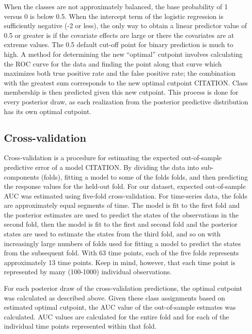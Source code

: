 \documentclass[12pt,letterpaper]{article}
\begin{document}
When the classes are not approximately balanced, the base probability of 1 versus 0 is below 0.5. When the intercept term of the logistic regression is sufficiently negative (-2 or less), the only way to obtain a linear predictor value of 0.5 or greater is if the covariate effects are large or there the covariates are at extreme values. The 0.5 default cut-off point for binary prediction is much to high. A method for determining the new ``optimal'' cutpoint involves calculating the ROC curve for the data and finding the point along that curve which maximizes both true positive rate and the false positive rate; the combination with the greatest sum corresponds to the new optimal cutpoint CITATION. Class membership is then predicted given this new cutpoint. This process is done for every posterior draw, as each realization from the posterior predictive distribution has its own optimal cutpoint.


\subsection{Cross-validation}

Cross-validation is a procedure for estimating the expected out-of-sample predictive error of a model CITATION. By dividing the data into sub-components (folds), fitting a model to some of the folds folds, and then predicting the response values for the held-out fold. For our dataset, expected out-of-sample AUC was estimated using five-fold cross-validation. For time-series data, the folds are approximately equal segments of time. The model is fit to the first fold and the posterior estimates are used to predict the states of the observations in the second fold, then the model is fit to the first and second fold and the posterior states are used to estimate the states from the third fold, and so on with increasingly large numbers of folds used for fitting a model to predict the states from the subsequent fold. With 63 time points, each of the five folds represents approximately 13 time points. Keep in mind, however, that each time point is represented by many (100-1000) individual observations.

For each posterior draw of the cross-validation predictions, the optimal cutpoint was calculated as described above. Given these class assignments based on estimated optimal cutpoint, the AUC value of the out-of-sample estmates was calculated. AUC values are calculated for the entire fold and for each of the individual time points represented within that fold.
\end{document}
